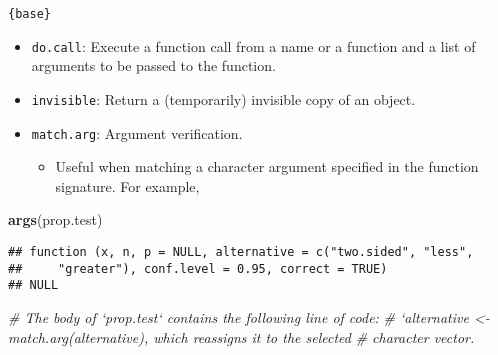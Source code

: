\documentclass[]{book}
\newenvironment{Shaded}{\begin{snugshade}}{\end{snugshade}}
\newcommand{\CommentTok}[1]{\textcolor[rgb]{0.56,0.35,0.01}{\textit{#1}}}
\newcommand{\KeywordTok}[1]{\textcolor[rgb]{0.13,0.29,0.53}{\textbf{#1}}}
\newcommand{\NormalTok}[1]{#1}
\providecommand{\tightlist}{%
  \setlength{\itemsep}{0pt}\setlength{\parskip}{0pt}}
\begin{document}
\texttt{\{base\}}

\begin{itemize}
\tightlist
\item
  \texttt{do.call}: Execute a function call from a name or a function and a list of arguments to be passed to the function.
\item
  \texttt{invisible}: Return a (temporarily) invisible copy of an object.
\item
  \texttt{match.arg}: Argument verification.

  \begin{itemize}
  \tightlist
  \item
    Useful when matching a character argument specified in the function signature. For example,
  \end{itemize}
\end{itemize}

\begin{Shaded}
\begin{Highlighting}[]
\KeywordTok{args}\NormalTok{(prop.test)}
\end{Highlighting}
\end{Shaded}

\begin{verbatim}
## function (x, n, p = NULL, alternative = c("two.sided", "less", 
##     "greater"), conf.level = 0.95, correct = TRUE) 
## NULL
\end{verbatim}

\begin{Shaded}
\begin{Highlighting}[]
\CommentTok{# The body of `prop.test` contains the following line of code:}
\CommentTok{# `alternative <- match.arg(alternative), which reassigns it to the selected}
\CommentTok{# character vector.}
\end{Highlighting}
\end{Shaded}
\end{document}
